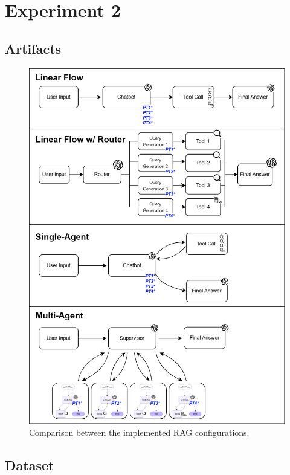
\chapter{Experiment 2}
    
    \section{Artifacts}

        \begin{figure}[h!]
            \centering
            \includegraphics[width=\textwidth]{images_exp2/diagrams/diagrama_todos.png}
            \caption{Comparison between the implemented RAG configurations.}
            \label{fig:diagrama_todos}
        \end{figure}

        \FloatBarrier

    \section{Dataset}
    \label{app:dataset}

